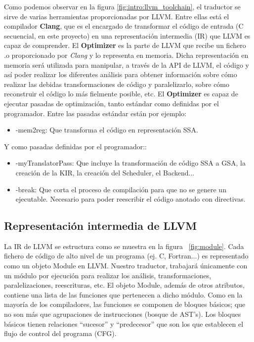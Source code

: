 Como podemos observar en la figura \ref{fig:intro:llvm_toolchain}, el traductor se sirve de varias herramientas proporcionadas por LLVM. 
Entre ellas está el compilador \textbf{Clang}, que es el encargado de transformar el código de entrada (C secuencial, en este proyecto) en una representación intermedia (IR) que LLVM es capaz de comprender.
El \textbf{Optimizer} es la parte de LLVM que recibe un fichero .o  proporcionado por \emph{Clang} y lo representa en memoria. Dicha representación en memoria será utilizada para manipular, a través de la API de LLVM, el código y así poder realizar los diferentes análisis para obtener información sobre cómo realizar las debidas transformaciones de código y paralelizarlo, sobre cómo reconstruir el código lo más fielmente posible, etc. El \textbf{Optimizer} es capaz de ejecutar pasadas de optimización, tanto estándar como definidas por el programador. 
Entre las pasadas estándar están por ejemplo:
\begin{itemize}
\item  -mem2reg:  Que transforma el código en representación SSA.
\end{itemize}
Y como pasadas definidas por el programador::
\begin{itemize}
\item  -myTranslatorPass: Que incluye la transformación de código SSA a GSA, la creación de la KIR, la creación del Scheduler, el Backend...
\item  -break: Que corta el proceso de compilación para que no se genere un ejecutable. Necesario para poder reescribir el código anotado con directivas.
\end{itemize}


\subsection{Representación intermedia de LLVM}

La IR de LLVM se estructura como se muestra en la figura ~\ref{fig:module}. Cada fichero de código de alto nivel de un programa (ej. C, Fortran...) es representado como un objeto Module en LLVM. Nuestro traductor, trabajará únicamente con un módulo por ejecución para realizar los análisis, transformaciones, paralelizaciones, reescrituras, etc. El objeto Module, además de otros atributos, contiene una lista de las funciones que pertenecen a dicho módulo. Como en la mayoría de los compiladores, las funciones se componen de bloques básicos; que no son más que agrupaciones de instrucciones (bosque de AST's). Los bloques básicos tienen relaciones ``sucesor'' y ``predecesor'' que son los que establecen el flujo de control del programa (CFG). 


